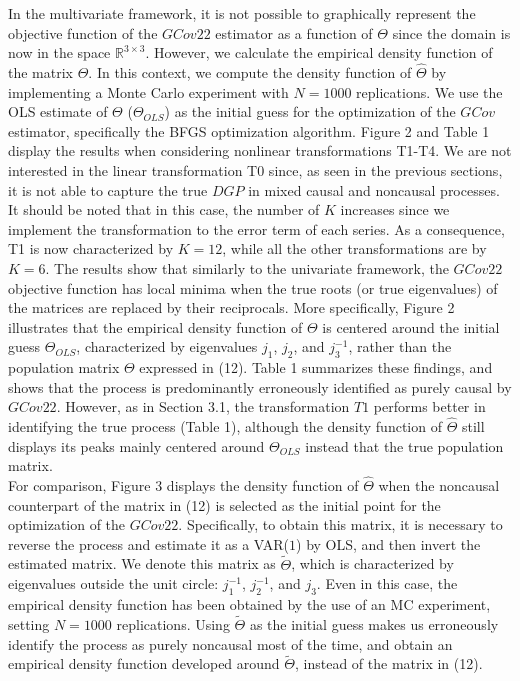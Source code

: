 \documentclass[<1p>]{elsarticle} %
\begin{document}
\indent In the multivariate framework, it is not possible to graphically represent the objective function of the $GCov22$ estimator as a function of $\Theta$ since the domain is now in the space $\mathbb{R}^{3 \times 3}$. However, we calculate the empirical density function of the matrix $\Theta$. In this context, we compute the density function of $\hat{\Theta}$ by implementing a Monte Carlo experiment with $N=1000$ replications. We use the OLS estimate of $\Theta$ ($\Theta_{OLS}$) as the initial guess for the optimization of the $GCov$ estimator, specifically the BFGS optimization algorithm. Figure 2 and Table 1 display the results when considering nonlinear transformations T1-T4. We are not interested in the linear transformation T0 since, as seen in the previous sections, it is not able to capture the true $DGP$ in mixed causal and noncausal processes. It should be noted that in this case, the number of $K$ increases since we implement the transformation to the error term of each series. As a consequence, T1 is now characterized by $K=12$, while all the other transformations are by $K=6$. The results show that similarly to the univariate framework, the $GCov22$ objective function has local minima when the true roots (or true eigenvalues) of the matrices are replaced by their reciprocals. More specifically, Figure 2 illustrates that the empirical density function of $\Theta$ is centered around the initial guess $\Theta_{OLS}$, characterized by eigenvalues $j_1$, $j_2$, and $j_3^{-1}$, rather than the population matrix $\Theta$ expressed in (12). Table 1 summarizes these findings, and shows that the process is predominantly erroneously identified as purely causal by $GCov22$. However, as in Section 3.1, the transformation $T1$ performs better in identifying the true process (Table 1), although the density function of $\hat{\Theta}$ still displays its peaks mainly centered around $\Theta_{OLS}$ instead that the true population matrix.\\
\indent For comparison, Figure 3 displays the density function of $\hat{\Theta}$ when the noncausal counterpart of the matrix in (12) is selected as the initial point for the optimization of the $GCov22$. Specifically, to obtain this matrix, it is necessary to reverse the process and estimate it as a VAR($1$) by OLS, and then invert the estimated matrix. We denote this matrix as $\tilde{\Theta}$, which is characterized by eigenvalues outside the unit circle: $j_{1}^{-1}$, $j_{2}^{-1}$, and $j_{3}$. Even in this case, the empirical density function has been obtained by the use of an MC experiment, setting $N=1000$ replications. Using $\tilde{\Theta}$ as the initial guess makes us erroneously identify the process as purely noncausal most of the time, and obtain an empirical density function developed around $\tilde{\Theta}$, instead of the matrix in (12).\\
\end{document}
